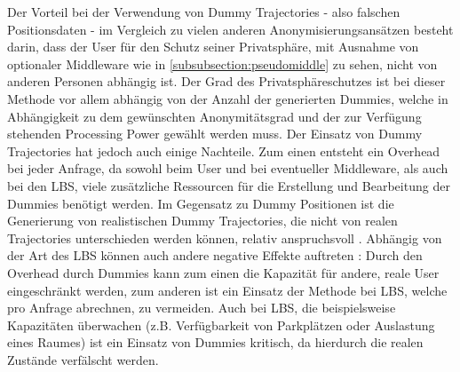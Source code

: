 Der Vorteil bei der Verwendung von Dummy Trajectories - also falschen Positionsdaten - im Vergleich zu vielen anderen Anonymisierungsansätzen besteht darin, dass der User für den Schutz seiner Privatsphäre, mit Ausnahme von optionaler Middleware wie in \ref{subsubsection:pseudomiddle} zu sehen, nicht von anderen Personen abhängig ist. 
Der Grad des Privatsphäreschutzes ist bei dieser Methode vor allem abhängig von der Anzahl der generierten Dummies, welche in Abhängigkeit zu dem gewünschten Anonymitätsgrad und der zur Verfügung stehenden Processing Power gewählt werden muss.
Der Einsatz von Dummy Trajectories hat jedoch auch einige Nachteile. Zum einen entsteht ein Overhead bei jeder Anfrage, da sowohl beim User und bei eventueller Middleware, als auch bei den LBS, viele zusätzliche Ressourcen für die Erstellung und Bearbeitung der Dummies benötigt werden. Im Gegensatz zu Dummy Positionen ist die Generierung von realistischen Dummy Trajectories, die nicht von realen Trajectories unterschieden werden können, relativ anspruchsvoll \cite{Beresford2003}. Abhängig von der Art des LBS können auch andere negative Effekte auftreten \cite{Beresford2005}: Durch den Overhead durch Dummies kann zum einen die Kapazität für andere, reale User eingeschränkt werden, zum anderen ist ein Einsatz der Methode bei LBS, welche pro Anfrage abrechnen, zu vermeiden. Auch bei LBS, die beispielsweise Kapazitäten überwachen (z.B. Verfügbarkeit von Parkplätzen oder Auslastung eines Raumes) ist ein Einsatz von Dummies kritisch, da hierdurch die realen Zustände verfälscht werden.

